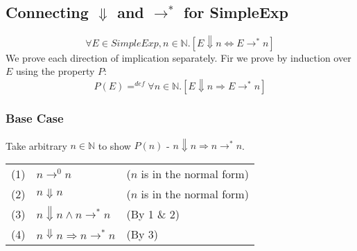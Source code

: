 \documentclass{report}
\begin{document}
        \subsection*{Connecting $\Downarrow$ and $\to^*$ for SimpleExp}
            \[\forall E \in SimpleExp, n \in \mathbb{N}.[E \Downarrow n \Leftrightarrow E \to^* n]\]
            We prove each direction of implication separately. Fir we prove by induction over $E$ using the property $P$:
            \[P(E) =^{def} \forall n \in \mathbb{N}.[E \Downarrow n \Rightarrow E \to^* n]\]
            \subsubsection*{Base Case}
                Take arbitrary $n \in \mathbb{N}$ to show $P(n)$ - $n \Downarrow n \Rightarrow n \to^* n$.
                \begin{center}
                    \begin{tabular}{l l l}
                        (1) & $n \to^0 n$ & ($n$ is in the normal form) \\
                        (2) & $n \Downarrow n$ & ($n$ is in the normal form) \\
                        (3) & $n \Downarrow n \land n \to^* n$ & (By 1 \& 2) \\
                        (4) & $n \Downarrow n \Rightarrow n \to^* n$ & (By 3) \\
                    \end{tabular}
                \end{center}
\end{document}
